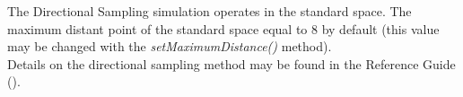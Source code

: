 \renewcommand{\filename}{docUC_ThresholdExceedance_DirectionalSampling.tex}
\renewcommand{\filetitle}{UC : Creation of a Directional Sampling  simulation algorithm}

\HeaderIIILevel





The Directional Sampling simulation operates in the standard space. The maximum distant point of the standard space equal to 8 by default (this value may be changed with the {\itshape setMaximumDistance()} method).\\


Details on the directional sampling method may be found in the Reference Guide ().\\



